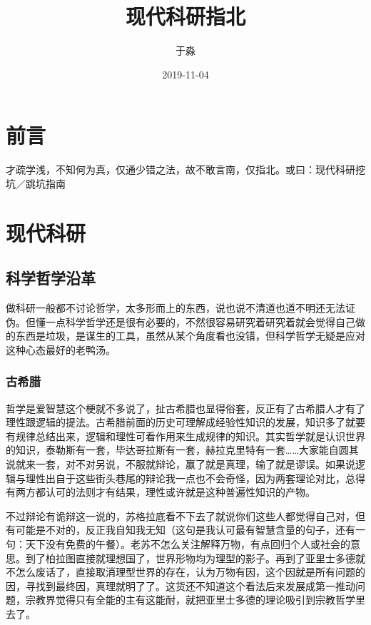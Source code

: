 \documentclass[]{tufte-book}
\title{现代科研指北}
\author{于淼}
\date{2019-11-04}
\begin{document}
\maketitle



{
\setcounter{tocdepth}{1}
\tableofcontents
}

\hypertarget{ux524dux8a00}{%
\chapter{前言}\label{ux524dux8a00}}

才疏学浅，不知何为真，仅通少错之法，故不敢言南，仅指北。或曰：现代科研挖坑／跳坑指南

\hypertarget{intro}{%
\chapter{现代科研}\label{intro}}

\hypertarget{ux79d1ux5b66ux54f2ux5b66ux6cbfux9769}{%
\section{科学哲学沿革}\label{ux79d1ux5b66ux54f2ux5b66ux6cbfux9769}}

做科研一般都不讨论哲学，太多形而上的东西，说也说不清道也道不明还无法证伪。但懂一点科学哲学还是很有必要的，不然很容易研究着研究着就会觉得自己做的东西是垃圾，是谋生的工具，虽然从某个角度看也没错，但科学哲学无疑是应对这种心态最好的老鸭汤。

\hypertarget{ux53e4ux5e0cux814a}{%
\subsection{古希腊}\label{ux53e4ux5e0cux814a}}

哲学是爱智慧这个梗就不多说了，扯古希腊也显得俗套，反正有了古希腊人才有了理性跟逻辑的提法。古希腊前面的历史可理解成经验性知识的发展，知识多了就要有规律总结出来，逻辑和理性可看作用来生成规律的知识。其实哲学就是认识世界的知识，泰勒斯有一套，毕达哥拉斯有一套，赫拉克里特有一套\ldots{}\ldots{}大家能自圆其说就来一套，对不对另说，不服就辩论，赢了就是真理，输了就是谬误。如果说逻辑与理性出自于这些街头巷尾的辩论我一点也不会奇怪，因为两套理论对比，总得有两方都认可的法则才有结果，理性或许就是这种普遍性知识的产物。

不过辩论有诡辩这一说的，苏格拉底看不下去了就说你们这些人都觉得自己对，但有可能是不对的，反正我自知我无知（这句是我认可最有智慧含量的句子，还有一句：天下没有免费的午餐）。老苏不怎么关注解释万物，有点回归个人或社会的意思。到了柏拉图直接就理想国了，世界形物均为理型的影子。再到了亚里士多德就不怎么废话了，直接取消理型世界的存在，认为万物有因，这个因就是所有问题的因，寻找到最终因，真理就明了了。这货还不知道这个看法后来发展成第一推动问题，宗教界觉得只有全能的主有这能耐，就把亚里士多德的理论吸引到宗教哲学里去了。
\end{document}
